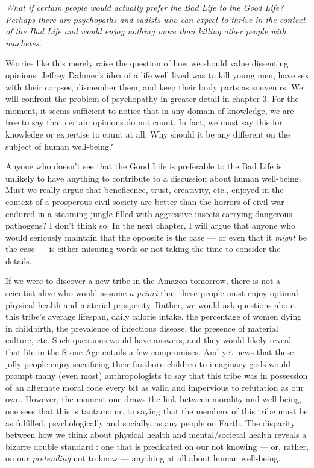 \documentclass[a4paper,14pt]{extbook}
\begin{document}
\textit{What if certain people would actually prefer the Bad Life to the Good Life?
      Perhaps there are psychopaths and sadists who can expect to thrive in the context of the Bad Life and would enjoy nothing more than killing other people with machetes.}

Worries like this merely raise the question of how we should value dissenting opinions.
Jeffrey Dahmer's idea of a life well lived was to kill young men, have sex with their corpses, dismember them, and keep their body parts as souvenirs.
We will confront the problem of psychopathy in greater detail in chapter 3.
For the moment, it seems sufficient to notice that in any domain of knowledge, we are free to say that certain opinions do not count.
In fact, we must say this for knowledge or expertise to count at all.
Why should it be any different on the subject of human well-being?

Anyone who doesn't see that the Good Life is preferable to the Bad Life is unlikely to have anything to contribute to a discussion about human well-being.
Must we really argue that beneficence, trust, creativity, etc., enjoyed in the context of a prosperous civil society are better than the horrors of civil war endured in a steaming jungle filled with aggressive insects carrying dangerous pathogens?
I don't think so.
In the next chapter, I will argue that anyone who would seriously maintain that the opposite is the case --- or even that it \textit{might} be the case --- is either misusing words or not taking the time to consider the details.

If we were to discover a new tribe in the Amazon tomorrow, there is not a scientist alive who would assume \textit{a priori} that these people must enjoy optimal physical health and material prosperity.
Rather, we would ask questions about this tribe's average lifespan, daily calorie intake, the percentage of women dying in childbirth, the prevalence of infectious disease, the presence of material culture, etc.
Such questions would have answers, and they would likely reveal that life in the Stone Age entails a few compromises.
And yet news that these jolly people enjoy sacrificing their firstborn children to imaginary gods would prompt many (even most) anthropologists to say that this tribe was in possession of an alternate moral code every bit as valid and impervious to refutation as our own.
However, the moment one draws the link between morality and well-being, one sees that this is tantamount to saying that the members of this tribe must be as fulfilled, psychologically and socially, as any people on Earth.
The disparity between how we think about physical health and mental/societal health reveals a bizarre double standard :
one that is predicated on our not knowing --- or, rather, on our \textit{pretending} not to know --- anything at all about human well-being.
\end{document}
